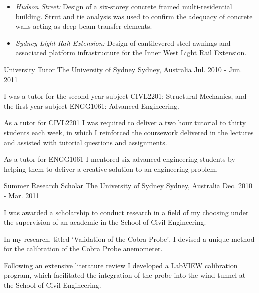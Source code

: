\begin{cventries}
{\begin{cvitems}
\begin{itemize}
\begin{itemize}
            \item \emph{Hudson Street:} Design of a six-storey concrete framed multi-residential
            building. Strut and tie analysis was used to confirm the adequacy of
            concrete walls acting as deep beam transfer elements.
            \item \emph{Sydney Light Rail Extension:} Design of cantilevered steel awnings and
            associated platform infrastructure for the Inner West Light Rail Extension.
          \end{itemize}
        \end{itemize}
      \end{cvitems}
    }

  \cventry
    {University Tutor} %
    {The University of Sydney} %
    {Sydney, Australia} %
    {Jul. 2010 - Jun. 2011} %
    {
      \begin{cvitems} %
        \item {I was a tutor for the second year subject CIVL2201: Structural Mechanics, and the first year subject ENGG1061: Advanced Engineering.}
        \item {As a tutor for CIVL2201 I was required to deliver a two hour tutorial to thirty students each week, in which I reinforced the coursework delivered in the lectures and assisted with tutorial questions and assignments.} 
        \item {As a tutor for ENGG1061 I mentored six advanced engineering students by helping them to deliver a creative solution to an engineering problem.}
      \end{cvitems}
    }

  \cventry
    {Summer Research Scholar} %
    {The University of Sydney} %
    {Sydney, Australia} %
    {Dec. 2010 - Mar. 2011} %
    {
      \begin{cvitems} %
        \item {I was awarded a scholarship to conduct research in a field of my choosing under the supervision of an academic in the School of Civil Engineering.} 
        \item {In my research, titled ‘Validation of the Cobra Probe’, I devised a unique method for the calibration of the Cobra Probe anemometer.} 
        \item {Following an extensive literature review I developed a LabVIEW calibration program, which facilitated the integration of the probe into the wind tunnel at the School of Civil Engineering.}
      \end{cvitems}
    }

\end{cventries}
